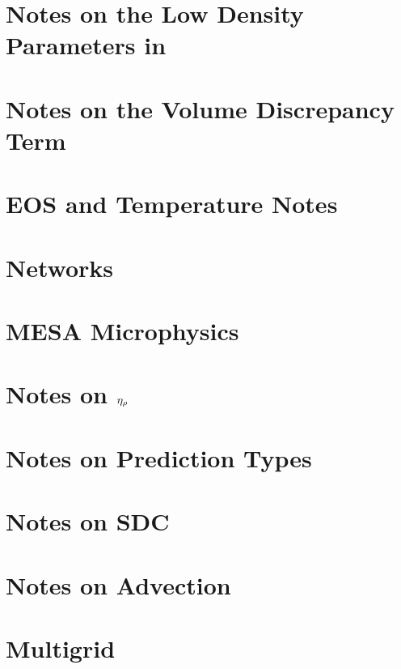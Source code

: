 \documentclass[11pt]{book}    %
\begin{document}
\chapter{Notes on the Low Density Parameters in \maestro}


\chapter{Notes on the Volume Discrepancy Term}


\chapter{EOS and Temperature Notes}


\chapter{Networks}


\chapter{MESA Microphysics}


\chapter{Notes on $\eta_{\rho}$}


\chapter{Notes on Prediction Types}


\chapter{Notes on SDC}
\label{ch:sdc}


\chapter{Notes on Advection}


\chapter{Multigrid}

\end{document}
